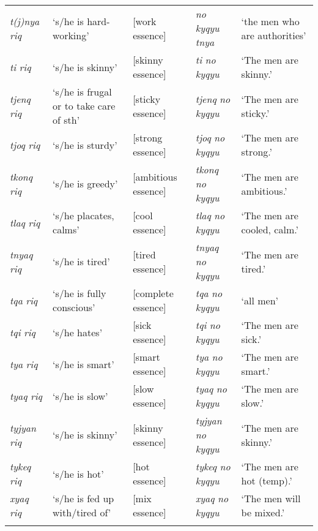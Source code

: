 \documentclass[output=paper]{langsci/langscibook}
\begin{document}
\begin{table}[t]
\small
\begin{tabularx}{\textwidth}{lQQlQ}
\midrule
\emph{t(j)nya} \emph{riq} &`s/he is hard-working'&[work essence]&\emph{no} \emph{kyqyu} \emph{tnya}  &`the men who are authorities' \\
\emph{ti} \emph{riq} &`s/he is skinny'&[skinny essence]&\emph{ti} \emph{no} \emph{kyqyu} &`The men are skinny.' \\
\emph{tjenq} \emph{riq} &`s/he is frugal or to take care of sth'&[sticky essence]&\emph{tjenq} \emph{no} \emph{kyqyu} &`The men are sticky.' \\
\emph{tjoq} \emph{riq} &`s/he is sturdy'&[strong essence]&\emph{tjoq} \emph{no} \emph{kyqyu} &`The men are strong.' \\
\emph{tkonq} \emph{riq} &`s/he is greedy'&[ambitious essence]&\emph{tkonq} \emph{no} \emph{kyqyu} &`The men are ambitious.' \\
\emph{tlaq} \emph{riq} &`s/he placates, calms'&[cool essence]&\emph{tlaq} \emph{no} \emph{kyqyu} &`The men are cooled, calm.' \\
\emph{tnyaq} \emph{riq} &`s/he is tired'&[tired essence]&\emph{tnyaq} \emph{no} \emph{kyqyu} &`The men are tired.' \\
\emph{tqa} \emph{riq} &`s/he is fully conscious'&[complete essence]&\emph{tqa} \emph{no} \emph{kyqyu} &`all men' \\
\emph{tqi} \emph{riq} &`s/he hates'&[sick essence]&\emph{tqi} \emph{no} \emph{kyqyu} &`The men are sick.' \\
\emph{tya} \emph{riq} &`s/he is smart'&[smart essence]&\emph{tya} \emph{no} \emph{kyqyu} &`The men are smart.' \\
\emph{tyaq} \emph{riq} &`s/he is slow'&[slow essence]&\emph{tyaq} \emph{no} \emph{kyqyu} &`The men are slow.' \\
\emph{tyjyan} \emph{riq} &`s/he is skinny'&[skinny essence]&\emph{tyjyan} \emph{no} \emph{kyqyu} &`The men are skinny.' \\
\emph{tykeq} \emph{riq} &`s/he is hot'&[hot essence]&\emph{tykeq} \emph{no} \emph{kyqyu} &`The men are hot (temp).' \\
\emph{xyaq} \emph{riq}&`s/he is fed up with/tired of'&[mix essence]&\emph{xyaq} \emph{no} \emph{kyqyu} &`The men will be mixed.' \\
\lspbottomrule
\end{tabularx}
\end{table}
\end{document}
